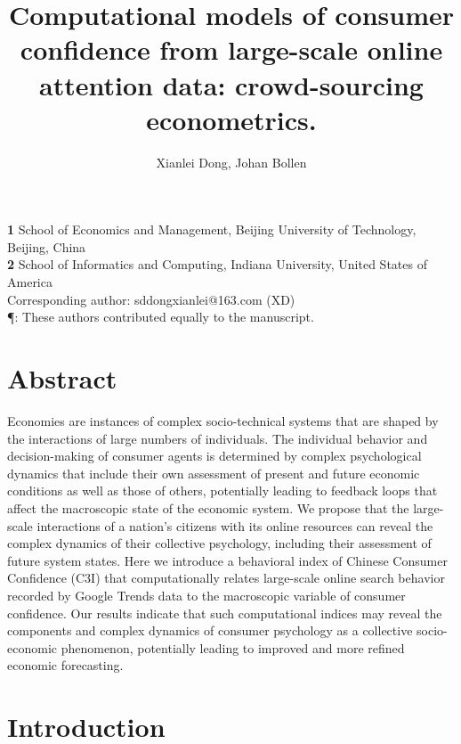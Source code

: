 \documentclass[10pt]{article}
\title{Computational models of consumer confidence from large-scale online attention data: crowd-sourcing econometrics.}
\author{Xianlei Dong,  Johan Bollen}
\begin{document}
\maketitle

\begin{flushleft}
\textbf{1} School of Economics and Management, Beijing University of Technology, Beijing, China\\
\textbf{2} School of Informatics and Computing,   Indiana University, United States of America\\

 Corresponding author: sddongxianlei@163.com (XD)\\
\P: These authors contributed equally to the manuscript.
\end{flushleft}	

\section*{Abstract}
Economies are instances of complex socio-technical systems that are shaped by the interactions of large numbers of individuals. The individual behavior and decision-making of consumer agents is determined by complex psychological dynamics that include their own assessment of present and future economic conditions as well as those of others, potentially leading to feedback loops that affect the macroscopic state of the economic system. We propose that the large-scale interactions of a nation's citizens with its online resources can reveal the complex dynamics of their collective psychology, including their assessment of future system states. Here we introduce a behavioral index of Chinese Consumer Confidence (C3I) that computationally relates large-scale online search behavior recorded by Google Trends data to the macroscopic variable of consumer confidence. Our results indicate that such computational indices may reveal the components and complex dynamics of consumer psychology as a collective socio-economic phenomenon, potentially leading to improved and more refined economic forecasting.

\section*{Introduction}
\end{document}
